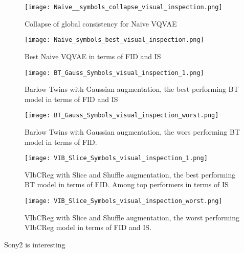 \documentclass[../../thesis.tex]{subfiles}
\begin{document}
\begin{figure}[H]
    \label{fig:Symbols_visual_inspection}
    \centering
    \begin{minipage}[b]{0.48\textwidth}
        \centering
        \texttt{[image: Naive\_\_symbols\_collapse\_visual\_inspection.png]}
        \caption*{Collapse of global consistency for Naive VQVAE}
    \end{minipage}
    \hfill
    \begin{minipage}[b]{0.48\textwidth}
        \centering
        \texttt{[image: Naive\_symbols\_best\_visual\_inspection.png]}
        \caption*{Best Naive VQVAE in terms of FID and IS}
    \end{minipage}
    \vspace{0.4cm}

    \begin{minipage}[b]{0.48\textwidth}
        \centering
        \texttt{[image: BT\_Gauss\_Symbols\_visual\_inspection\_1.png]}
        \caption*{Barlow Twins with Gaussian augmentation, the best performing BT model in terms of FID and IS}
    \end{minipage}
    \begin{minipage}[b]{0.48\textwidth}
        \centering
        \texttt{[image: BT\_Gauss\_Symbols\_visual\_inspection\_worst.png]}
        \caption*{Barlow Twins with Gaussian augmentation, the wors performing BT model in terms of FID.}
    \end{minipage}
      \vspace{0.4cm}
    
    \begin{minipage}[b]{0.48\textwidth}
        \centering
        \texttt{[image: VIB\_Slice\_Symbols\_visual\_inspection\_1.png]}
        \caption*{VIbCReg with Slice and Shuffle augmentation, the best performing BT model in terms of FID. Among top performers in terms of IS}
    \end{minipage}
    \begin{minipage}[b]{0.48\textwidth}
        \centering
        \texttt{[image: VIB\_Slice\_Symbols\_visual\_inspection\_worst.png]}
        \caption*{VIbCReg with Slice and Shuffle augmentation, the worst performing VIbCReg model in terms of FID and IS.}
    \end{minipage}
    
\end{figure}

Sony2 is interesting
\end{document}
